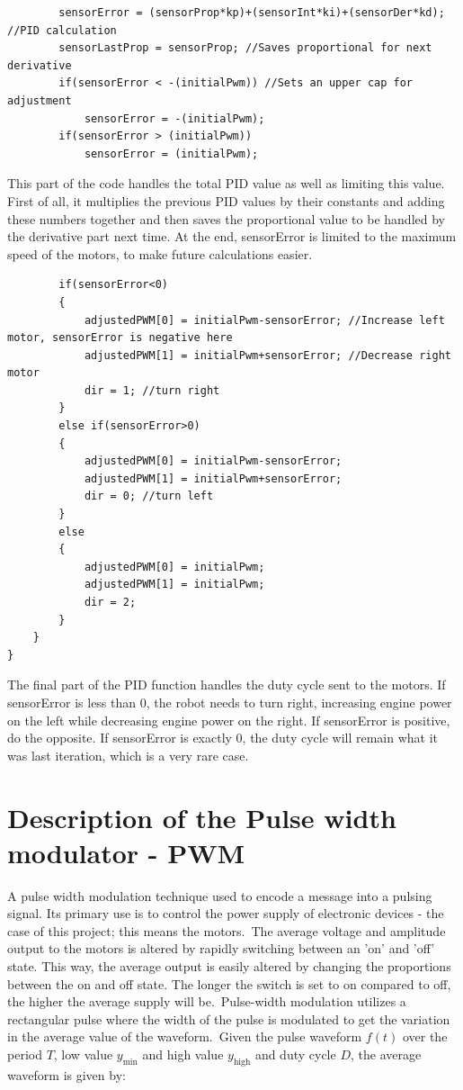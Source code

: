 \begin{lstlisting}
		sensorError = (sensorProp*kp)+(sensorInt*ki)+(sensorDer*kd); //PID calculation
		sensorLastProp = sensorProp; //Saves proportional for next derivative
		if(sensorError < -(initialPwm)) //Sets an upper cap for adjustment
			sensorError = -(initialPwm);
		if(sensorError > (initialPwm))
			sensorError = (initialPwm);
\end{lstlisting}
This part of the code handles the total PID value as well as limiting this value. First of all, it multiplies the previous PID values by their constants and adding these numbers together and then saves the proportional value to be handled by the derivative part next time. At the end, sensorError is limited to the maximum speed of the motors, to make future calculations easier.

\begin{lstlisting}
		if(sensorError<0)
		{
			adjustedPWM[0] = initialPwm-sensorError; //Increase left motor, sensorError is negative here
			adjustedPWM[1] = initialPwm+sensorError; //Decrease right motor
			dir = 1; //turn right
		}
		else if(sensorError>0)
		{
			adjustedPWM[0] = initialPwm-sensorError;
			adjustedPWM[1] = initialPwm+sensorError; 
			dir = 0; //turn left
		}
		else
		{
			adjustedPWM[0] = initialPwm;
			adjustedPWM[1] = initialPwm;
			dir = 2;
		}
	}
}
\end{lstlisting}
The final part of the PID function handles the duty cycle sent to the motors. If sensorError is less than 0, the robot needs to turn right, increasing engine power on the left while decreasing engine power on the right. If sensorError is positive, do the opposite. If sensorError is exactly 0, the duty cycle will remain what it was last iteration, which is a very rare case.

\section{Description of the Pulse width modulator - PWM}

A pulse width modulation technique used to encode a message into a pulsing signal. Its primary use is to control the power supply of electronic devices - the case of this project; this means the motors.\
The average voltage and amplitude output to the motors is altered by rapidly switching between an 'on' and 'off' state. This way, the average output is easily altered by changing the proportions between the on and off state. The longer the switch is set to on compared to off, the higher the average supply will be.\
Pulse-width modulation utilizes a rectangular pulse where the width of the pulse is modulated to get the variation in the average value of the waveform.\ Given the pulse waveform $f(t)$ over the period $T$, low value $y_\mathrm{min}$ and high value $y_\mathrm{high}$ and duty cycle $D$, the average waveform is given by: \\

